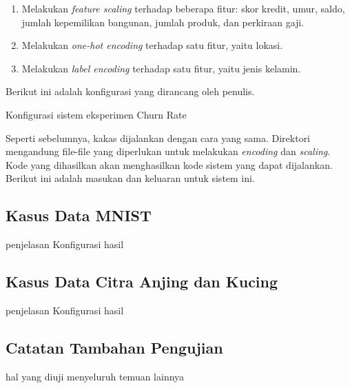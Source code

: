 \begin{enumerate}
	\item Melakukan \textit{feature scaling} terhadap beberapa fitur: skor kredit, umur, saldo, jumlah kepemilikan bangunan, jumlah produk, dan perkiraan gaji.
	\item Melakukan \textit{one-hot encoding} terhadap satu fitur, yaitu lokasi.
	\item Melakukan \textit{label encoding} terhadap satu fitur, yaitu jenis kelamin.
\end{enumerate}

Berikut ini adalah konfigurasi yang dirancang oleh penulis.

\begin{code}
	\caption{Konfigurasi sistem eksperimen Churn Rate}\label{listing:22}
\end{code}

Seperti sebelumnya, kakas dijalankan dengan cara yang sama.
Direktori mengandung file-file yang diperlukan untuk melakukan \textit{encoding} dan \textit{scaling}.
Kode yang dihasilkan akan menghasilkan kode sistem yang dapat dijalankan.
Berikut ini adalah masukan dan keluaran untuk sistem ini.

\subsection{Kasus Data MNIST}

penjelasan
Konfigurasi
hasil

\subsection{Kasus Data Citra Anjing dan Kucing}

penjelasan
Konfigurasi
hasil

\subsection{Catatan Tambahan Pengujian}

hal yang diuji menyeluruh
temuan lainnya
